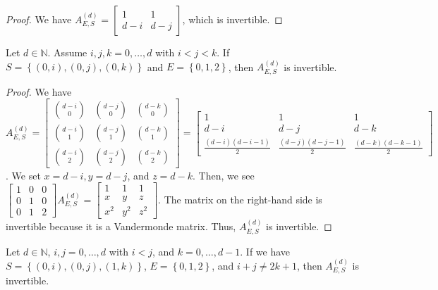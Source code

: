 \begin{proof}
    We have \( A^{(d)}_{E,S} = \begin{bmatrix}
        1 & 1 \\ d-i & d-j
    \end{bmatrix} \), which is invertible.
\end{proof}

\begin{proposition}\label{prop:impossible-support-2}
    Let \( d \in \mathbb{N} \). Assume \( i,j,k=0, \dots, d \) with \( i < j < k \). If \( S = \left\{ (0,i), (0,j), (0,k) \right\} \) and \( E = \left\{ 0,1,2 \right\} \), then \( A^{(d)}_{E,S} \) is invertible.
\end{proposition}

\begin{proof}
    We have  \( A^{(d)}_{E,S} = \begin{bmatrix}
        \binom{d-i}{0} & \binom{d-j}{0} & \binom{d-k}{0} \\
        \binom{d-i}{1} & \binom{d-j}{1} & \binom{d-k}{1} \\
        \binom{d-i}{2} & \binom{d-j}{2} & \binom{d-k}{2}
    \end{bmatrix} = \begin{bmatrix}
        1 & 1 & 1 \\
        d-i & d-j & d-k \\
        \frac{(d-i)(d-i-1)}{2} & \frac{(d-j)(d-j-1)}{2} & \frac{(d-k)(d-k-1)}{2}
    \end{bmatrix} \).
    We set \( x = d-i, y = d-j \), and \( z = d-k \).
    Then, we see \( \begin{bmatrix}
        1 & 0 & 0 \\
        0 & 1 & 0 \\
        0 & 1 & 2
    \end{bmatrix}A^{(d)}_{E,S} = \begin{bmatrix}
        1 & 1 & 1 \\
        x & y & z \\
        x^2 & y^2 & z^2
    \end{bmatrix} \).
    The matrix on the right-hand side is invertible because it is a Vandermonde matrix. Thus, \( A^{(d)}_{E,S} \) is invertible.
\end{proof}

\begin{proposition}\label{prop:impossible-support-2324223423123123}
    Let \( d \in \mathbb{N} \), \( i,j=0, \dots, d \) with \( i < j \), and \( k=0, \dots, d-1 \). If we have \( S = \left\{ (0,i), (0,j), (1,k) \right\} \), \( E = \left\{ 0,1,2 \right\} \), and \( i+j \neq 2k + 1 \), then \( A^{(d)}_{E,S} \) is invertible.
\end{proposition}

